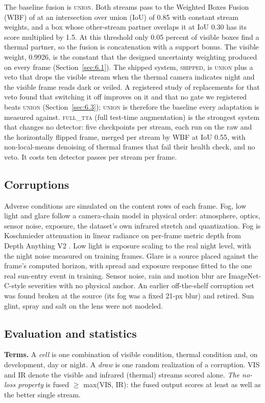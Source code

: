 \documentclass[journal]{IEEEtran}
\begin{document}
The baseline fusion is \textsc{union}. Both streams pass to the Weighted Boxes Fusion (WBF) of \citet{solovyev2021weighted} at an intersection over union (IoU) of 0.85 with constant stream weights, and a box whose other-stream partner overlaps it at IoU 0.30 has its score multiplied by 1.5. At this threshold only 0.05 percent of visible boxes find a thermal partner, so the fusion is concatenation with a support bonus. The visible weight, 0.9926, is the constant that the designed uncertainty weighting produced on every frame (Section~\ref{sec:6.1}). The shipped system, \textsc{shipped}, is \textsc{union} plus a veto that drops the visible stream when the thermal camera indicates night and the visible frame reads dark or veiled. A registered study of replacements for that veto found that switching it off improves on it and that no gate we registered beats \textsc{union} (Section~\ref{sec:6.3}); \textsc{union} is therefore the baseline every adaptation is measured against. \textsc{full\_tta} (full test-time augmentation) is the strongest system that changes no detector: five checkpoints per stream, each run on the raw and the horizontally flipped frame, merged per stream by WBF at IoU 0.55, with non-local-means denoising of thermal frames that fail their health check, and no veto. It costs ten detector passes per stream per frame.

\subsection{Corruptions}\label{sec:3.3}
Adverse conditions are simulated on the content rows of each frame. Fog, low light and glare follow a camera-chain model in physical order: atmosphere, optics, sensor noise, exposure, the dataset's own infrared stretch and quantization. Fog is Koschmieder attenuation in linear radiance on per-frame metric depth \cite{sakaridis2018semantic} from Depth Anything V2 \cite{yang2024depth}. Low light is exposure scaling to the real night level, with the night noise measured on training frames. Glare is a source placed against the frame's computed horizon, with spread and exposure response fitted to the one real sun-entry event in training. Sensor noise, rain and motion blur are ImageNet-C-style severities \cite{hendrycks2019benchmarking} with no physical anchor. An earlier off-the-shelf corruption set was found broken at the source (its fog was a fixed 21-px blur) and retired. Sun glint, spray and salt on the lens were not modeled.

\subsection{Evaluation and statistics}\label{sec:3.4}
\textbf{Terms.} A \emph{cell} is one combination of visible condition, thermal condition and, on development, day or night. A \emph{draw} is one random realization of a corruption. VIS and IR denote the visible and infrared (thermal) streams scored alone. \emph{The no-loss property} is fused $\geq$ max(VIS, IR): the fused output scores at least as well as the better single stream.
\end{document}
